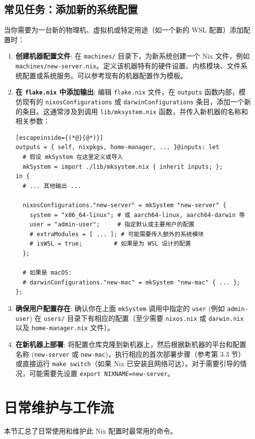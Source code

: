 \documentclass[11pt, a4paper]{article} %
\begin{document}
\subsection{常见任务：添加新的系统配置}
当你需要为一台新的物理机、虚拟机或特定用途（如一个新的 WSL 配置）添加配置时：
\begin{enumerate}[label=\textbf{\arabic*.}, wide, labelwidth=!, labelindent=0pt]
    \item \textbf{创建机器配置文件}: 在 \texttt{machines/} 目录下，为新系统创建一个 Nix 文件，例如 \texttt{machines/new-server.nix}。定义该机器特有的硬件设置、内核模块、文件系统配置或系统服务。可以参考现有的机器配置作为模板。
    \item \textbf{在 \texttt{flake.nix} 中添加输出}: 编辑 \texttt{flake.nix} 文件，在 \texttt{outputs} 函数内部，模仿现有的 \texttt{nixosConfigurations} 或 \texttt{darwinConfigurations} 条目，添加一个新的条目。这通常涉及到调用 \texttt{lib/mksystem.nix} 函数，并传入新机器的名称和相关参数：
        \begin{lstlisting}[escapeinside={(*@}{@*)}]
outputs = { self, nixpkgs, home-manager, ... }@inputs: let
  # 假设 mkSystem 在这里定义或导入
  mkSystem = import ./lib/mksystem.nix { inherit inputs; };
in {
  # ... 其他输出 ...

  nixosConfigurations."new-server" = mkSystem "new-server" {
    system = "x86_64-linux"; # 或 aarch64-linux, aarch64-darwin 等
    user = "admin-user";     # 指定默认或主要用户的配置
    # extraModules = [ ... ]; # 可能需要传入额外的系统模块
    # isWSL = true;         # 如果是为 WSL 设计的配置
  };

  # 如果是 macOS:
  # darwinConfigurations."new-mac" = mkSystem "new-mac" { ... };
};
        \end{lstlisting}
    \item \textbf{确保用户配置存在}: 确认你在上面 \texttt{mkSystem} 调用中指定的 \texttt{user} (例如 \texttt{admin-user}) 在 \texttt{users/} 目录下有相应的配置（至少需要 \texttt{nixos.nix} 或 \texttt{darwin.nix} 以及 \texttt{home-manager.nix} 文件）。
    \item \textbf{在新机器上部署}: 将配置仓库克隆到新机器上，然后根据新机器的平台和配置名称 (\texttt{new-server} 或 \texttt{new-mac})，执行相应的首次部署步骤（参考第 3.3 节）或直接运行 \texttt{make switch}（如果 Nix 已安装且网络可达）。对于需要引导的情况，可能需要先设置 \texttt{export NIXNAME=new-server}。
\end{enumerate}

\section{日常维护与工作流}
本节汇总了日常使用和维护此 Nix 配置时最常用的命令。
\end{document}
